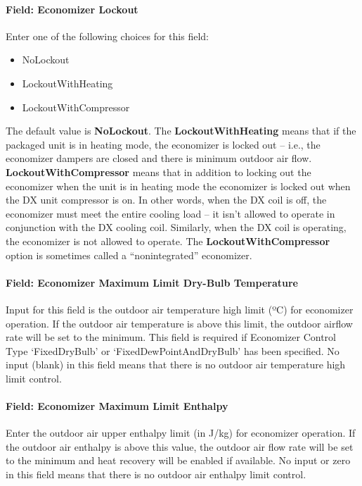 \paragraph{Field: Economizer Lockout}\label{field-economizer-lockout-2-000}

Enter one of the following choices for this field:

\begin{itemize}
\item
  NoLockout
\item
  LockoutWithHeating
\item
  LockoutWithCompressor
\end{itemize}

The default value is \textbf{NoLockout}. The \textbf{LockoutWithHeating} means that if the packaged unit is in heating mode, the economizer is locked out -- i.e., the economizer dampers are closed and there is minimum outdoor air flow. \textbf{LockoutWithCompressor} means that in addition to locking out the economizer when the unit is in heating mode the economizer is locked out when the DX unit compressor is on. In other words, when the DX coil is off, the economizer must meet the entire cooling load -- it isn't allowed to operate in conjunction with the DX cooling coil. Similarly, when the DX coil is operating, the economizer is not allowed to operate. The \textbf{LockoutWithCompressor} option is sometimes called a ``nonintegrated'' economizer.

\paragraph{Field: Economizer Maximum Limit Dry-Bulb Temperature}\label{field-economizer-maximum-limit-dry-bulb-temperature-1}

Input for this field is the outdoor air temperature high limit (ºC) for economizer operation. If the outdoor air temperature is above this limit, the outdoor airflow rate will be set to the minimum. This field is required if Economizer Control Type `FixedDryBulb' or `FixedDewPointAndDryBulb' has been specified. No input (blank) in this field means that there is no outdoor air temperature high limit control.

\paragraph{Field: Economizer Maximum Limit Enthalpy}\label{field-economizer-maximum-limit-enthalpy-1}

Enter the outdoor air upper enthalpy limit (in J/kg) for economizer operation. If the outdoor air enthalpy is above this value, the outdoor air flow rate will be set to the minimum and heat recovery will be enabled if available. No input or zero in this field means that there is no outdoor air enthalpy limit control.

